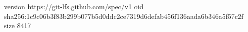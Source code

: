 version https://git-lfs.github.com/spec/v1
oid sha256:1c9c06b3f83b299b077b5d0ddc2ce7319d6defab456f136aada6b346a5f57c2f
size 8417
